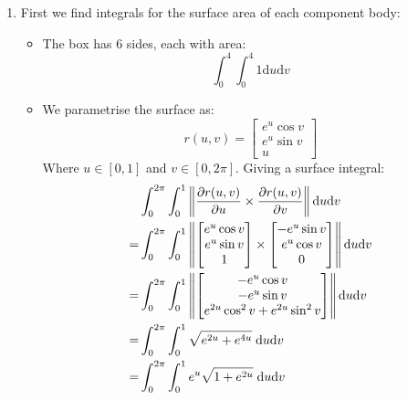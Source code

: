 \documentclass[a4paper, 11pt]{article}
\def\pp#1#2{\frac{\partial #1}{\partial #2}}
\begin{document}
\begin{enumerate}[label=(\alph*)]
	\item First we find integrals for the surface area of each component body:
	      \begin{itemize}
		      \item The box has 6 sides, each with area:
		            \[
			            \int_0^4\int_0^4 1\text{d$u$}\text{d$v$}
		            \]

		      \item We parametrise the surface as:
		            $$r(u,v)=\begin{bmatrix}
				            e^u \cos v \\
				            e^u \sin v \\
				            u
			            \end{bmatrix} $$
		            Where $u\in[0,1]$ and $v\in[0,2\pi]$. Giving a surface integral:
		            \begin{align*}
			              & \int_0^{2\pi}\int_0^1 \left\|\pp {r(u,v)}{u} \times \pp{r(u,v)}{v} \right\| \text d u \text d v \\
			            = & \int_0^{2\pi}\int_0^1 \left\|
			            \begin{bmatrix}
				            e^u\cos v \\ e^u\sin v \\ 1
			            \end{bmatrix}\times
			            \begin{bmatrix}
				            -e^u\sin v \\
				            e^u\cos v  \\
				            0
			            \end{bmatrix}
			            \right\| \text d u \text d v                                                                        \\
			            = & \int_0^{2\pi}\int_0^1 \left\| \begin{bmatrix}
				                                              -e^u\cos v \\ -e^u\sin v\\  e^{2u}\cos^2v +  e^{2u}\sin^2v
			                                              \end{bmatrix} \right\| \text d u \text d v         \\
			            = & \int_0^{2\pi}\int_0^1 \sqrt{e^{2u}+e^{4u}} \;\text d u \text d v                                \\
			            = & \int_0^{2\pi}\int_0^1 e^{u}\sqrt{1+e^{2u}} \;\text d u \text d v                                \\
		            \end{align*}



\end{itemize}
\end{enumerate}
\end{document}
